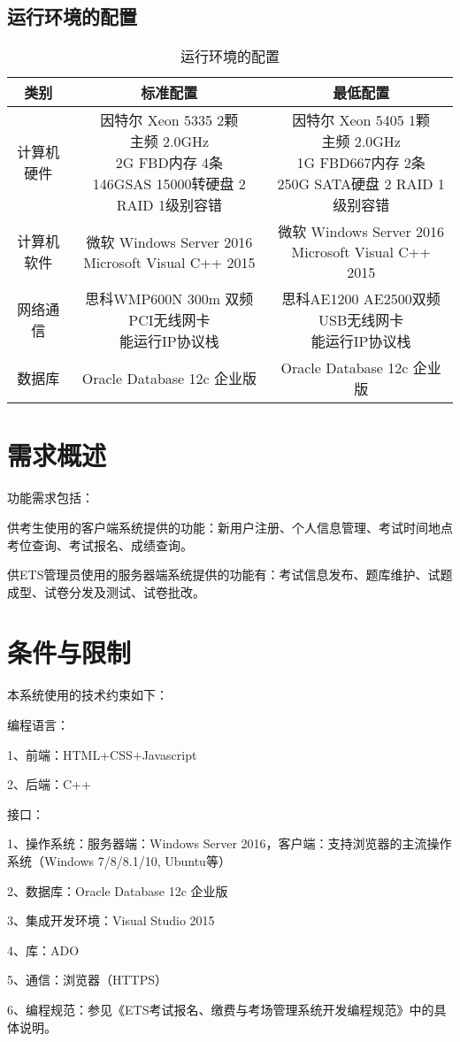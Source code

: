 \subsection{运行环境的配置}
\begin{table}[htbp]
\centering
\caption{运行环境的配置} \label{tab:operation-environment}
\begin{tabular}{|c|c|c|}
    \hline
    类别 & 标准配置 & 最低配置 \\
    \hline
    计算机硬件 & \tabincell{c}{因特尔 Xeon 5335 2颗\\ 主频 2.0GHz\\ 2G FBD内存 4条\\ 146GSAS 15000转硬盘 2 RAID 1级别容错} & \tabincell{c}{因特尔 Xeon 5405 1颗\\ 主频 2.0GHz\\ 1G FBD667内存 2条\\ 250G SATA硬盘 2 RAID 1级别容错} \\
    \hline
    计算机软件 & \tabincell{c}{微软 Windows Server 2016\\ Microsoft Visual C++ 2015} & \tabincell{c}{微软 Windows Server 2016\\ Microsoft Visual C++ 2015} \\
    \hline
    网络通信 & \tabincell{c}{思科WMP600N 300m 双频 PCI无线网卡\\ 能运行IP协议栈} & \tabincell{c}{思科AE1200 AE2500双频USB无线网卡\\ 能运行IP协议栈} \\
    \hline
    数据库 & Oracle Database 12c 企业版 & Oracle Database 12c 企业版 \\
    \hline

\end{tabular}
\end{table}

\section{需求概述}
功能需求包括：

供考生使用的客户端系统提供的功能：新用户注册、个人信息管理、考试时间地点考位查询、考试报名、成绩查询。

供ETS管理员使用的服务器端系统提供的功能有：考试信息发布、题库维护、试题成型、试卷分发及测试、试卷批改。


\section{条件与限制}
本系统使用的技术约束如下：

编程语言：

1、前端：HTML+CSS+Javascript

2、后端：C++

接口：

1、操作系统：服务器端：Windows Server 2016，客户端：支持浏览器的主流操作系统（Windows 7/8/8.1/10, Ubuntu等）
	
2、数据库：Oracle Database 12c 企业版
	
3、集成开发环境：Visual Studio 2015
	
4、库：ADO
	
5、通信：浏览器（HTTPS）
	
6、编程规范：参见《ETS考试报名、缴费与考场管理系统开发编程规范》中的具体说明。

